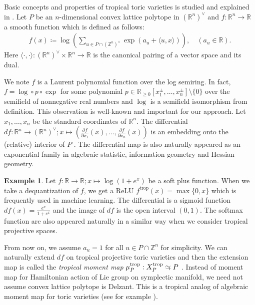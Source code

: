 \documentclass[a4paper,dvipdfmx,reqno,12pt]{amsart}
\theoremstyle{definition}
\newtheorem{example}[theorem]{Example}
\newcommand{\deq}{\coloneqq}
\newcommand{\opn}[1]{\operatorname{#1}}
\newcommand{\abk}[1]{\langle {#1} \rangle}%
\newcommand{\simto}{ 
\mathrel{\raisebox{0.13em}{${\sim}$}}
\kern -0.75em \mathrel{\raisebox{-0.11em}{${\scriptstyle \to}$}}  
}
\numberwithin{equation}{section}
\begin{document}
Basic concepts and properties 
of tropical toric varieties is studied and 
explained in \cite{MR2428356,MR2511632,meyer2011intersection,MR3287221}.
Let $P$ be an $n$-dimensional convex lattice polytope in
$(\mathbb{R}^{n})^{\vee}$ and
$f\colon \mathbb{R}^{n} \to \mathbb{R}$ a 
smooth function which is defined as follows:
\begin{align}
  f(x)\deq\log (\sum_{u\in P\cap (\mathbb{Z}^{n})^{\vee}} 
\opn{exp}(a_u+\abk{u,x})),\quad  (a_u\in \mathbb{R}).
\label{equation-log-polynomial} 
\end{align}
Here 
$\abk{\cdot,\cdot}\colon 
(\mathbb{R}^{n})^{\vee}\times \mathbb{R}^{n}\to\mathbb{R}$
is the canonical pairing of a vector space and its dual.

We note $f$ is a Laurent polynomial function over the 
log semiring. 
In fact, $f=\opn{log}\circ p\circ \opn{exp}$ 
for some polynomial 
$p\in \mathbb{R}_{\geq 0}[x_1^{\pm},\ldots,x_n^{\pm}]
\setminus \{0\}$ over the semifield of nonnegative
real numbers and $\opn{log}$ is a semifield isomorphism
from definition.
This observation is well-known and important 
for our approach.
Let $x_1,\ldots,x_n$ be the standard coordinates of 
$\mathbb{R}^{n}$.
The differential
$df:{\mathbb{R}}^{n}\to ({\mathbb{R}}^{n})^{\vee}; x\mapsto 
(\frac{\partial f}{\partial x_1}(x),\ldots,\frac{\partial f}{\partial x_n}(x))$ 
is an embedding onto the (relative) interior of $P$
\cite[p.124 Exercise]{MR1301331}. 
The differential map is also naturally appeared as an 
exponential family in algebraic statistic,
information geometry and Hessian geometry.
\begin{example}
Let $f\colon \mathbb{R} \to {\mathbb{R}}; x\mapsto \log (1+e^{x})$ be a soft 
plus function. When we take a dequantization of $f$,
we get a ReLU $f^{\opn{trop}}(x)=\max\{0,x\}$ which 
is frequently used in machine learning.
The differential is a sigmoid function 
$df(x)=\frac{e^{x}}{1+e^{x}}$ and 
the image of $df$ is the open interval $(0,1)$.
The softmax function are also appeared 
naturally in a similar way 
when we consider tropical projective spaces.
\end{example}

From now on, we assume 
$a_u=1$ for all $u\in P\cap \mathbb{Z}^{n}$ for simplicity.
We can naturally extend $df$ on tropical projective toric 
varieties and then the extension map is called the \emph{tropical moment map}
$\mu_{P}^{\opn{trop}}: X_{P}^{\opn{trop}}\simto P$ 
\cite[Definition 2.1 (2)]{MR2428356}.
Instead of moment map for Hamiltonian action of Lie group on
symplectic manifold, we
need not assume convex lattice polytope is Delzant.
This is a tropical analog of algebraic moment map 
for toric varieties
(see for example
\cite[]{MR2810322}).
\end{document}
